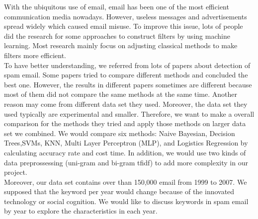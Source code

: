 
With the ubiquitous use of email, email has been one of the most efficient communication media nowadays. However, useless messages and advertisements spread widely which caused email misuse. To improve this issue, lots of people did the research for some approaches to construct filters by using machine learning. Most research mainly focus on adjusting classical methods to make filters more efficient.\\

To have better understanding, we referred from lots of papers about detection of spam email. Some papers tried to compare different methods and concluded the best one. However, the results in different papers sometimes are different because most of them did not compare the same methods at the same time. Another reason may come from different data set they used. Moreover, the data set they used typically are experimental and smaller. Therefore, we want to make a overall comparison for the methods they tried and apply those methods on larger data set we combined. We would compare six methods: Naive Bayesian, Decision Trees,SVMs, KNN, Multi Layer Perceptron (MLP), and Logistics Regression by calculating accuracy rate and cost time. In addition, we would use two kinds of data preprossessing (uni-gram and bi-gram tfidf) to add more complexity in our project.\\

Moreover, our data set contains over than 150,000 email from 1999 to 2007. We supposed that the keyword per year would change because of the innovated technology or social cognition. We would like to discuss keywords in spam email by year to explore the characteristics in each year.\\


